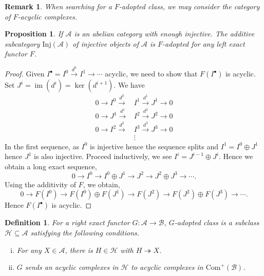 \documentclass[10pt]{article}
\numberwithin{equation}{section}
\newtheorem{proposition}{Proposition}[section]
\newtheorem{definition}{Definition}[section]
\newtheorem{remark}{Remark}[section]
\DeclareMathOperator{\image}{im}
\newcommand{\sA}[0]{\mathscr{A}}
\newcommand{\sB}[0]{\mathscr{B}}
\newcommand{\Com}[0]{\mathrm{Com}}
\begin{document}
\begin{remark}
    When searching for a $F$-adopted class, we may consider the category of $F$-acyclic complexes.
\end{remark}

\begin{proposition}
    If $\sA$ is an abelian category with enough injective. The additive subcategory $\mathrm{Inj}(\sA)$ of injective objects of $\sA$ is $F$-adopted for any left exact functor $F$.
\end{proposition}
\begin{proof}
    Given $I^\bullet = I^0\stackrel{d^0}{\to}I^1\to\cdots$ acyclic, we need to show that $F(I^\bullet)$ is acyclic. Set $J^i = \image (d^i) = \ker(d^{i+1})$. We have 
    \begin{align*}
        0\to I^0\stackrel{d^0}{\to}&I^1\stackrel{d^1}{\to}J^1\to0\\
        0\to J^1\stackrel{d^1}{\to}&I^2\stackrel{d^2}{\to}J^2\to0\\
        0\to I^2\stackrel{d^2}{\to}&I^3\stackrel{d^3}{\to}J^3\to0\\
        &\vdots
    \end{align*}
    In the first sequence, as $I^0$ is injective hence the sequence splits and $I^1= I^0\oplus J^1$ hence $J^1$ is also injective. Proceed inductively, we see $I^i = J^{i-1}\oplus J^i$. Hence we obtain a long exact sequence,
    \begin{equation*}
        0\to I^0\to I^0\oplus J^1\to J^2\to J^2\oplus J^3\to\cdots.
    \end{equation*}
    Using the additivity of $F$, we obtain,
     \begin{equation*}
        0\to F(I^0)\to F(I^0)\oplus F(J^1)\to F(J^2)\to F(J^2)\oplus F(J^3)\to\cdots.
    \end{equation*}
    Hence $F(I^\bullet)$ is acyclic.
\end{proof}

\begin{definition}
    For a right exact functor $G:\sA\to \sB$, $G$-adopted class is a subclass $\mathscr{H}\subseteq\sA$ satisfying the following conditions.
    \begin{enumerate}[i.]
        \item For any $X\in \sA$, there is $H\in\mathscr{H}$ with $H\twoheadrightarrow X$.
        \item $G$ sends an acyclic complexes in $\mathscr{H}$ to acyclic complexes in $\Com^+(\sB)$.
    \end{enumerate}
\end{definition}
\end{document}
